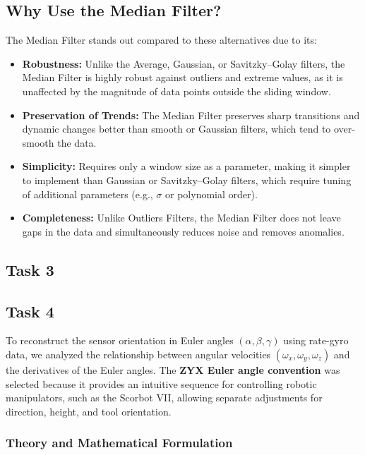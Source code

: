 \documentclass[12pt]{article}
\begin{document}
\subsection*{Why Use the Median Filter?}
The Median Filter stands out compared to these alternatives due to its:
\begin{itemize}
    \item \textbf{Robustness:} Unlike the Average, Gaussian, or Savitzky–Golay filters, the Median Filter is highly robust against outliers and extreme values, as it is unaffected by the magnitude of data points outside the sliding window.
    \item \textbf{Preservation of Trends:} The Median Filter preserves sharp transitions and dynamic changes better than smooth or Gaussian filters, which tend to over-smooth the data.
    \item \textbf{Simplicity:} Requires only a window size as a parameter, making it simpler to implement than Gaussian or Savitzky–Golay filters, which require tuning of additional parameters (e.g., \(\sigma\) or polynomial order).
    \item \textbf{Completeness:} Unlike Outliers Filters, the Median Filter does not leave gaps in the data and simultaneously reduces noise and removes anomalies.
\end{itemize}


\subsection{Task 3}


\subsection{Task 4}

To reconstruct the sensor orientation in Euler angles \((\alpha, \beta, \gamma)\) using rate-gyro data, we analyzed the relationship between angular velocities \((\omega_x, \omega_y, \omega_z)\) and the derivatives of the Euler angles. The \textbf{ZYX Euler angle convention} was selected because it provides an intuitive sequence for controlling robotic manipulators, such as the Scorbot VII, allowing separate adjustments for direction, height, and tool orientation.

\subsubsection{Theory and Mathematical Formulation}
\end{document}
